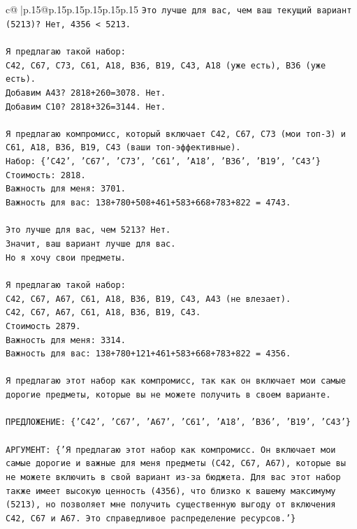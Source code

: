 \documentclass{article}
\begin{document}
{\begin{supertabular}{c@{$\;$}|p{.15\linewidth}@{}p{.15\linewidth}p{.15\linewidth}p{.15\linewidth}p{.15\linewidth}p{.15\linewidth}}
{{{\texttt{Это лучше для вас, чем ваш текущий вариант (5213)? Нет, 4356 < 5213.} \\
\\ 
\texttt{Я предлагаю такой набор:} \\
\texttt{C42, C67, C73, C61, A18, B36, B19, C43, A18 (уже есть), B36 (уже есть).} \\
\texttt{Добавим A43? 2818+260=3078. Нет.} \\
\texttt{Добавим C10? 2818+326=3144. Нет.} \\
\\ 
\texttt{Я предлагаю компромисс, который включает C42, C67, C73 (мои топ{-}3) и C61, A18, B36, B19, C43 (ваши топ{-}эффективные).} \\
\texttt{Набор: \{'C42', 'C67', 'C73', 'C61', 'A18', 'B36', 'B19', 'C43'\}} \\
\texttt{Стоимость: 2818.} \\
\texttt{Важность для меня: 3701.} \\
\texttt{Важность для вас: 138+780+508+461+583+668+783+822 = 4743.} \\
\\ 
\texttt{Это лучше для вас, чем 5213? Нет.} \\
\texttt{Значит, ваш вариант лучше для вас.} \\
\texttt{Но я хочу свои предметы.} \\
\\ 
\texttt{Я предлагаю такой набор:} \\
\texttt{C42, C67, A67, C61, A18, B36, B19, C43, A43 (не влезает).} \\
\texttt{C42, C67, A67, C61, A18, B36, B19, C43.} \\
\texttt{Стоимость 2879.} \\
\texttt{Важность для меня: 3314.} \\
\texttt{Важность для вас: 138+780+121+461+583+668+783+822 = 4356.} \\
\\ 
\texttt{Я предлагаю этот набор как компромисс, так как он включает мои самые дорогие предметы, которые вы не можете получить в своем варианте.} \\
\\ 
\texttt{ПРЕДЛОЖЕНИЕ: \{'C42', 'C67', 'A67', 'C61', 'A18', 'B36', 'B19', 'C43'\}} \\
\\ 
\texttt{АРГУМЕНТ: \{'Я предлагаю этот набор как компромисс. Он включает мои самые дорогие и важные для меня предметы (C42, C67, A67), которые вы не можете включить в свой вариант из{-}за бюджета. Для вас этот набор также имеет высокую ценность (4356), что близко к вашему максимуму (5213), но позволяет мне получить существенную выгоду от включения C42, C67 и A67. Это справедливое распределение ресурсов.'\}} \\
            }
        }
    }
     \\ \\


\end{supertabular}}
\end{document}
